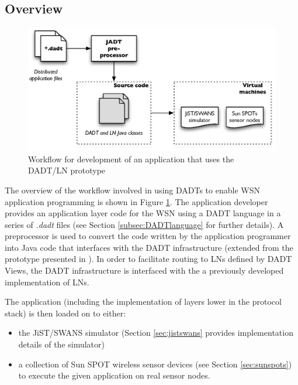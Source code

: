 \subsection{Overview}
\begin{figure}
\centering
\includegraphics[width=\textwidth]{img/DADTLN_workflow.eps} 
\caption[DADT/LN application workflow]{Workflow for development of an application that uses
the DADT/LN prototype}
\label{Fig:DADTLN_workflow}
\end{figure} 
The overview of the workflow involved in using DADTs to enable WSN application
programming is shown in Figure \ref{Fig:DADTLN_workflow}. The application
developer provides an application layer code for the WSN using a DADT
language in a series of \emph{.dadt} files (see Section
\ref{subsec:DADTlanguage} for further details). A preprocessor is used to
convert the code written by the application programmer into Java code that interfaces with the DADT infrastructure (extended from the prototype presented in
\cite{migliavacca_DADT:2006}). In order to facilitate routing to LNs defined by DADT Views, the DADT infrastructure is interfaced with the a
previously developed implementation of LNs. 

The application (including the implementation of layers lower in the protocol
stack) is then loaded on to either:
\begin{itemize}
\item the JiST/SWANS simulator \cite{barr_JIST:2005, barr_SWANS} (Section
\ref{sec:jistswans} provides implementation details of the simulator) 
\item a collection of Sun SPOT wireless sensor devices
\cite{simon_squawk:2006} (see Section \ref{sec:sunspots}) to execute the given 
application on real sensor nodes.
\end{itemize}

